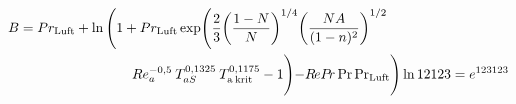\documentclass{article}
\DeclareMathOperator{\pp}{Pr}
\newcommand{\Reynolds}{R\hspace*{-0.09em}e}
\newcommand{\Prandtl}{P\hspace*{-0.185em}r}
\begin{document}
\begin{align}
B &=  Pr_\text{Luft} +\ln\left(1+Pr_\text{Luft} \exp\Biggl(\frac{2}{3}\biggl(\frac{1-N}{N}\biggl)^{1/4}\biggl(\frac{NA}{(1-n)^2}\biggl)^{1/2} \notag \right. \\
& \left. \qquad \qquad \qquad \qquad Re_a^{-0,5}\: T_{aS}^{0,1325}\:T_\text{a\:krit} ^{0,1175}-1\Biggl)- \Reynolds \Prandtl \pp \text{Pr}_\text{Luft}\right)  \ln 12123 = e^{123123}
\end{align}

\kAvogadro
\end{document}
